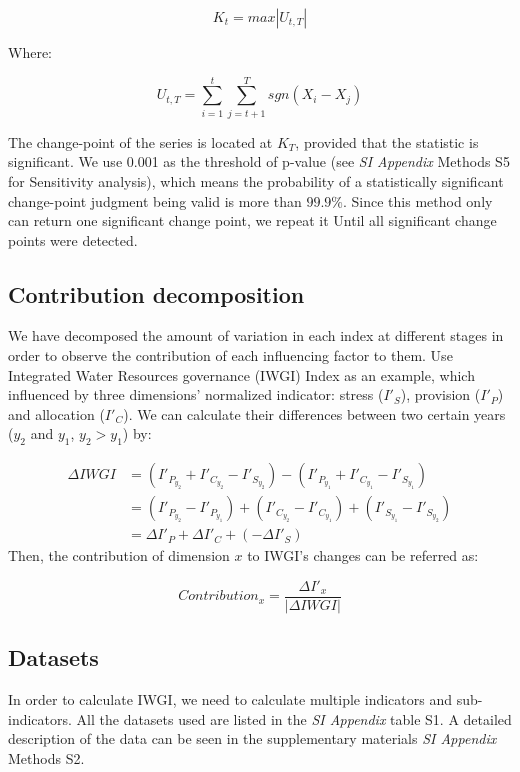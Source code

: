 \documentclass[9pt, twocolumn, twoside, lineno]{pnas-new}
\begin{document}
{		$$ K_t = max|U_{t, T}|$$

		Where:

		$$ U_{t, T} = \sum_{i=1}^t\sum_{j=t+1}^T sgn(X_i - X_j) $$
	
		The change-point of the series is located at $K_T$, provided that the statistic is significant. We use 0.001 as the threshold  of p-value (see \textit{SI Appendix} Methods S5 for Sensitivity analysis), which means the probability of a statistically significant change-point judgment being valid is more than $99.9\%$.
		Since this method only can return one significant change point, we repeat it Until all significant change points were detected.
	
	\subsection*{Contribution decomposition}
		We have decomposed the amount of variation in each index at different stages in order to observe the contribution of each influencing factor to them. Use Integrated Water Resources governance (IWGI) Index as an example, which influenced by three dimensions' normalized indicator: stress ($I'_S$), provision ($I'_P$) and allocation ($I'_C$). We can calculate their differences between two certain years ($y_2$ and $y_1$, $y_2 > y_1$) by:

		\begin{align*}
			\Delta IWGI &= (I'_{P_{y_2}} + I'_{C_{y_2}} - I'_{S_{y_2}}) - (I'_{P_{y_1}} + I'_{C_{y_1}} - I'_{S_{y_1}}) \\
			&= (I'_{P_{y_2}} - I'_{P_{y_1}}) + (I'_{C_{y_2}} - I'_{C_{y_1}}) + (I'_{S_{y_1}} - I'_{S_{y_2}}) \\
			&= \Delta I'_P + \Delta I'_C + (-\Delta I'_S)
		\end{align*}
		Then, the contribution of dimension $x$ to IWGI's changes can be referred as:

		$$ Contribution_x = \frac{\Delta I'_x}{|\Delta IWGI|} $$



	\subsection*{Datasets}
	In order to calculate IWGI, we need to calculate multiple indicators and sub-indicators. All the datasets used are listed in the \textit{SI Appendix} table S1. A detailed description of the data can be seen in the supplementary materials \textit{SI Appendix} Methods S2.
}
\end{document}
